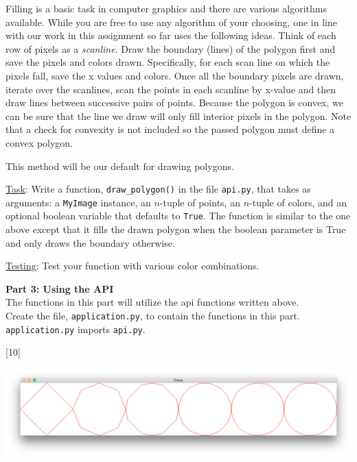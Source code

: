 \documentclass[addpoints]{exam}
\begin{document}
\begin{questions}
  Filling is a basic task in computer graphics and there are various algorithms available. While you are free to use any algorithm of your choosing, one in line with our work in this assignment so far uses the following ideas. Think of each row of pixels as a \textit{scanline}. Draw the boundary (lines) of the polygon first and save the pixels and colors drawn. Specifically, for each scan line on which the pixels fall, save the x values and colors. Once all the boundary pixels are drawn, iterate over the scanlines, scan the points in each scanline by x-value and then draw lines between successive pairs of points. 
  Because the polygon is convex, we can be sure that the line we draw will only fill interior pixels in the polygon. Note that a check for convexity is not included so the passed polygon must define a convex polygon.

  This method will be our default for drawing polygons.

  \underline{Task}: Write a function, \texttt{draw\_polygon()} in the file \texttt{api.py}, that takes as arguments: a \texttt{MyImage} instance, an $n$-tuple of points, an $n$-tuple of colors, and an optional boolean variable that defaults to \texttt{True}. The function is similar to the one above except that it fills the drawn polygon when the boolean parameter is True and only draws the boundary otherwise.

  \underline{Testing}: Test your function with various color combinations.

  \begin{EnvFullwidth}
    {\Large\bf Part 3: Using the API}\\

    The functions in this part will utilize the api functions written above.\\ Create the file, \texttt{application.py}, to contain the functions in this part. \texttt{application.py} imports \texttt{api.py}.
  \end{EnvFullwidth}
  
[10]
  \begin{center}
    \includegraphics[width=\linewidth]{circle}
  \end{center}


\end{questions}
\end{document}
